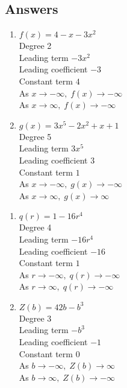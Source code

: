 \documentclass{ximera}
\begin{document}
\subsection{Answers}

\begin{enumerate}

\item $f(x) = 4-x-3x^2$ \\
Degree 2 \\
Leading term $-3x^{2}$\\
Leading coefficient $-3$\\
Constant term $4$\\
As $x \rightarrow -\infty, \; f(x) \rightarrow -\infty$\\
As $x \rightarrow \infty, \; f(x) \rightarrow -\infty$\\

\item  $g(x) = 3x^5 - 2x^2 + x + 1$ \\
Degree 5 \\
Leading term $3x^5$\\
Leading coefficient $3$\\
Constant term $1$\\
As $x \rightarrow -\infty, \; g(x) \rightarrow -\infty$\\
As $x \rightarrow \infty, \; g(x) \rightarrow \infty$\\


\setcounter{HW}{\value{enumi}}
\end{enumerate}

\begin{enumerate}
\setcounter{enumi}{\value{HW}}

\item $q(r) = 1 - 16r^{4}$\\
Degree 4 \\
Leading term $-16r^{4}$\\
Leading coefficient $-16$\\
Constant term $1$\\
As $r \rightarrow -\infty, \; q(r) \rightarrow -\infty$\\
As $r \rightarrow \infty, \; q(r) \rightarrow -\infty$\\

\item $Z(b) = 42b - b^{3}$\\
Degree 3 \\
Leading term $-b^{3}$\\
Leading coefficient $-1$\\
Constant term $0$\\
As $b \rightarrow -\infty, \; Z(b) \rightarrow \infty$\\
As $b \rightarrow \infty, \; Z(b) \rightarrow -\infty$\\

\setcounter{HW}{\value{enumi}}
\end{enumerate}
\end{document}
